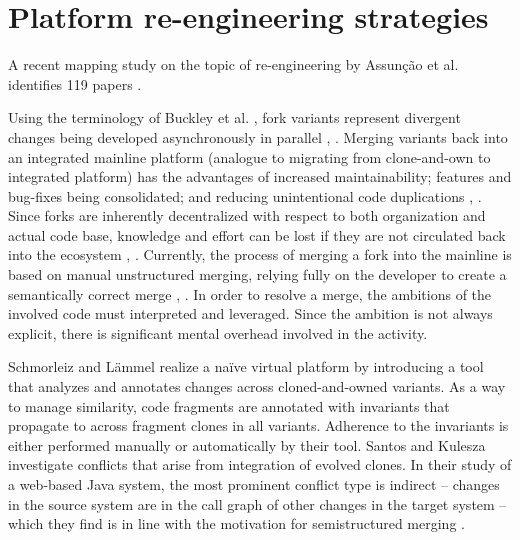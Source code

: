 \section{Platform re-engineering strategies}
A recent mapping study on the topic of re-engineering by Assun{\c{c}}{\~a}o et al. identifies 119 papers \cite{assuncao2017mapping}.

Using the terminology of Buckley et al. \cite{buckley2005}, fork variants represent divergent changes being developed asynchronously in parallel \cite{mens2002}, \cite{stanciulescu2015}. Merging variants back into an integrated mainline platform (analogue to migrating from clone-and-own to integrated platform) has the advantages of increased maintainability; features and bug-fixes being consolidated; and reducing unintentional code duplications \cite{schmorleiz2016similarity}, \cite{stanciulescu2015}. Since forks are inherently decentralized with respect to both organization and actual code base, knowledge and effort can be lost if they are not circulated back into the ecosystem \cite{stanciulescu2015}, \cite{gousios2015}. Currently, the process of merging a fork into the mainline is based on manual unstructured merging, relying fully on the developer to create a semantically correct merge \cite{mens2002}, \cite{apel2011}. In order to resolve a merge, the ambitions of the involved code must interpreted and leveraged. Since the ambition is not always explicit, there is significant mental overhead involved in the activity.

Schmorleiz and Lämmel \cite{schmorleiz2016similarity} realize a naïve virtual platform by introducing a tool that analyzes and annotates changes across cloned-and-owned variants. As a way to manage similarity, code fragments are annotated with invariants that propagate to across fragment clones in all variants. Adherence to the invariants is either performed manually or automatically by their tool. Santos and Kulesza \cite{santos} investigate conflicts that arise from integration of evolved clones. In their study of a web-based Java system, the most prominent conflict type is indirect -- changes in the source system are in the call graph of other changes in the target system -- which they find is in line with the motivation for semistructured merging \cite{apel2011}.

